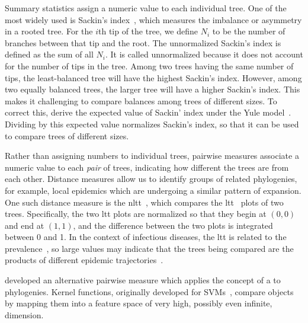 Summary statistics assign a numeric value to each individual tree. One of the
most widely used is Sackin's index~\autocite{shao1990tree}, which measures the
imbalance or asymmetry in a rooted tree. For the $i$th tip of the tree, we
define $N_i$ to be the number of branches between that tip and the root. The
unnormalized Sackin's index is defined as the sum of all $N_i$. It is called
unnormalized because it does not account for the number of tips in the tree.
Among two trees having the same number of tips, the least-balanced tree will
have the highest Sackin's index. However, among two equally balanced trees, the
larger tree will have a higher Sackin's index. This makes it challenging to
compare balances among trees of different sizes. To correct this,
\textcite{kirkpatrick1993searching} derive the expected value of Sackin' index
under the Yule model~\autocite{yule1925mathematical}. Dividing by this expected
value normalizes Sackin's index, so that it can be used to compare trees of
different sizes.

Rather than assigning numbers to individual trees, pairwise measures associate
a numeric value to each \textit{pair} of trees, indicating how different the
trees are from each other. Distance measures allow us to identify groups of
related phylogenies, for example, local epidemics which are undergoing a
similar pattern of expansion. One such distance measure is the
\gls{nltt}~\autocite{janzen2015approximate}, which compares the
\gls{ltt}~\autocite{nee1992tempo} plots of two trees. Specifically, the two
\gls{ltt} plots are normalized so that they begin at $(0, 0)$ and end at $(1,
1)$, and the difference between the two plots is integrated between 0 and 1. In
the context of infectious diseases, the \gls{ltt} is related to the
prevalence~\autocite{holmes1995revealing}, so large values may indicate that
the trees being compared are the products of different epidemic
trajectories~\autocite{janzen2015approximate}.

\textcite{poon2013mapping} developed an alternative pairwise measure which
applies the concept of a  to phylogenies. Kernel
functions, originally developed for \glspl{SVM}~\autocite{burges1998tutorial}, 
compare objects by mapping them into a feature space of very high, possibly
even infinite, dimension.

